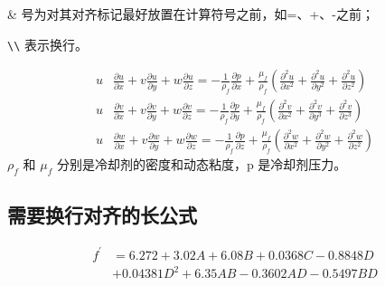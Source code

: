 \& 号为对其对齐标记最好放置在计算符号之前，如=、+、-之前；

\verb|\\| 表示换行。

\begin{align}%
    u & \frac{\partial u}{\partial x}+v \frac{\partial u}{\partial y}+w \frac{\partial u}{\partial z}=-\frac{1}{\rho_{f}} \frac{\partial p}{\partial x}+\frac{\mu_{f}}{\rho_{f}}\left(\frac{\partial^{2} u}{\partial x^{2}}+\frac{\partial^{2} u}{\partial y^{2}}+\frac{\partial^{2} u}{\partial z^{2}}\right) \\
    u & \frac{\partial v}{\partial x}+v \frac{\partial v}{\partial y}+w \frac{\partial v}{\partial z}=-\frac{1}{\rho_{f}} \frac{\partial p}{\partial y}+\frac{\mu_{f}}{\rho_{f}}\left(\frac{\partial^{2} v}{\partial x^{2}}+\frac{\partial^{2} v}{\partial y^{3}}+\frac{\partial^{2} v}{\partial z^{3}}\right) \\
    u & \frac{\partial w}{\partial x}+v \frac{\partial w}{\partial y}+w \frac{\partial w}{\partial z}=-\frac{1}{\rho_{f}} \frac{\partial p}{\partial z}+\frac{\mu_{f}}{\rho_{f}}\left(\frac{\partial^{2} w}{\partial x^{2}}+\frac{\partial^{2} w}{\partial y^{2}}+\frac{\partial^{2} w}{\partial z^{2}}\right)
\end{align}
$\rho_{f}$ 和 $\mu_{f}$ 分别是冷却剂的密度和动态粘度，p 是冷却剂压力。


\subsection{需要换行对齐的长公式}

\begin{equation}\label{eq:P}
    \begin{split}
        f^{\prime} & = 6.272 + 3.02 A + 6.08 B + 0.0368 C - 0.8848 D  \\
            & + 0.04381 D^2 + 6.35 AB - 0.3602 AD - 0.5497 BD
    \end{split}
\end{equation}

